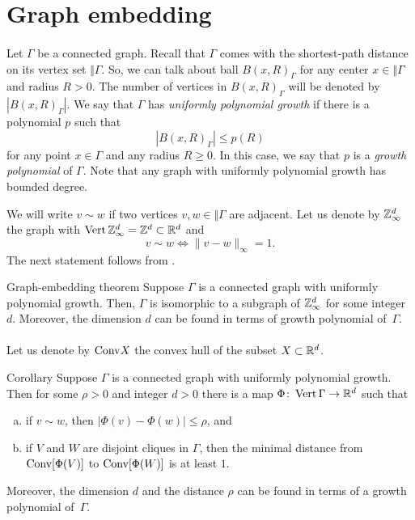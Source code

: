 \documentclass[a4paper,10pt]{article}
\begin{document}
\section*{Graph embedding}

\paragraph{}\label{par:graph-embedding}
Let $\Gamma$ be a connected graph.
Recall that $\Gamma$ comes with the shortest-path distance on its vertex set $\Vert \Gamma$.
So, we can talk about ball $B(x,R)_\Gamma$ for any center $x\in \Vert \Gamma$ and radius $R>0$.
The number of vertices in $B(x,R)_\Gamma$ will be denoted by $|B(x,R)_\Gamma|$.
We say that $\Gamma$ has \emph{uniformly polynomial growth} if there is a polynomial $p$ such that 
\[|B(x,R)_\Gamma|\le p(R)\]
for any point $x\in \Gamma$ and any radius $R\ge 0$.
In this case, we say that $p$ is a \emph{growth polynomial} of $\Gamma$.
Note that any graph with uniformly polynomial growth has bounded degree.

We will write $v\sim w$ if two vertices $v,w\in \Vert \Gamma$ are adjacent.
Let us denote by $\mathbb{Z}^d_\infty$ the graph with $\mathop{\rm Vert} \mathbb{Z}^d_\infty=\mathbb{Z}^d\subset \mathbb{R}^d$ and
\[v\sim w \iff  \|v-w\|_\infty=1.\]
The next statement follows from \cite[Theorem 5.5]{krauthgamer-lee1}.

\begin{thm}{Graph-embedding theorem}\label{thm:graph-embedding}
Suppose $\Gamma$ is a connected graph with uniformly polynomial growth.
Then, $\Gamma$ is isomorphic to a subgraph of $\mathbb{Z}^d_\infty$ for some integer~$d$.
Moreover, the dimension $d$ can be found in terms of growth polynomial of~$\Gamma$.
\end{thm}

\paragraph{}\label{par:Phi}
Let us denote by $\text{\rm Conv} X$ the convex hull of the subset $X\subset \mathbb{R}^d$.

\begin{thm}{Corollary}\label{cor:graph-embedding}
Suppose $\Gamma$ is a connected graph with uniformly polynomial growth.
Then for some $\rho>0$ and integer $d>0$ there is a map $\Phi\colon\mathop{\rm Vert} \Gamma\to \mathbb{R}^d$ such that
\begin{enumerate}[(a)]
\item if $v\sim w$, then $|\Phi(v)-\Phi(w)|\le \rho$, and 
\item if $V$ and $W$ are disjoint cliques in $\Gamma$, then the minimal distance from $\text{\rm Conv}[\Phi(V)]$ to $\text{\rm Conv}[\Phi(W)]$ is at least $1$.
\end{enumerate}
Moreover, the dimension $d$ and the distance $\rho$ can be found in terms of a growth polynomial of~$\Gamma$.
\end{thm}
\end{document}
